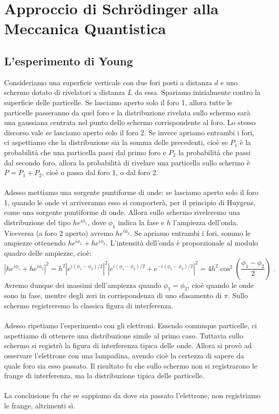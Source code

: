 \documentclass[10pt,a4paper]{report}
\theoremstyle{definition}
\numberwithin{equation}{section}
\begin{document}
\chapter{Approccio di Schrödinger alla Meccanica Quantistica}
\section{L'esperimento di Young}
Consideriamo una superficie verticale con due fori posti a distanza $d$ e uno schermo dotato di rivelatori a distanza $L$ da essa. Spariamo inizialmente contro la superficie delle particelle. Se lasciamo aperto solo il foro 1, allora tutte le particelle passeranno da quel foro e la distribuzione rivelata sullo schermo sarà una gaussiana centrata nel punto dello schermo corrispondente al foro. Lo stesso discorso vale se lasciamo aperto solo il foro 2. Se invece apriamo entrambi i fori, ci aspettiamo che la distribuzione sia la somma delle precedenti, cioè se $P_1$ è la probabilità che una particella passi dal primo foro e $P_2$ la probabilità che passi dal secondo foro, allora la probabilità di rivelare una particella sullo schermo è $P=P_1+P_2$, cioè o passa dal foro 1, o dal foro 2. \\
\\
Adesso mettiamo una sorgente puntiforme di onde: se lasciamo aperto solo il foro 1, quando le onde vi arriveranno esso si comporterà, per il principio di Huygens, come una sorgente puntiforme di onde. Allora sullo schermo riveleremo una distribuzione del tipo $h e^{i\phi_1}$, dove $\phi_1$ indica la fase e $h$ l'ampiezza dell'onda. Viceversa (a foro 2 aperto) avremo $h e^{i\phi_2}$. Se apriamo entrambi i fori, sommo le ampiezze ottenendo $he^{i\phi_1}+he^{i\phi_2}$. L'intensità dell'onda è proporzionale al modulo quadro delle ampiezze, cioè:
$$
\left|he^{i\phi_1}+he^{i\phi_2}\right|^2=h^2\left|e^{i(\phi_1-\phi_2)/2}\right|^2\left|e^{i(\phi_1-\phi_2)/2}+e^{-i(\phi_1-\phi_2)/2}\right|^2=4h^2\cos^2\left(\frac{\phi_1-\phi_2}{2}\right)\;.
$$
Avremo dunque dei massimi dell'ampiezza quando $\phi_1=\phi_2$, cioè quando le onde sono in fase, mentre degli zeri in corrispondenza di uno sfasamento di $\pi$. Sullo schermo registreremo la classica figura di interferenza. \\
\\
Adesso ripetiamo l'esperimento con gli elettroni. Essendo comunque particelle, ci aspettiamo di ottenere una distribuzione simile al primo caso. Tuttavia sullo schermo si registrò la figura di interferenza tipica delle onde. Allora si provò ad osservare l'elettrone con una lampadina, avendo cioè la certezza di sapere da quale foro sia esso passato. Il risultato fu che sullo schermo non si registrarono le frange di interferenza, ma la distribuzione tipica delle particelle. \\
\\
La conclusione fu che se sappiamo da dove sia passato l'elettrone, non registriamo le frange, altrimenti sì.
\end{document}
